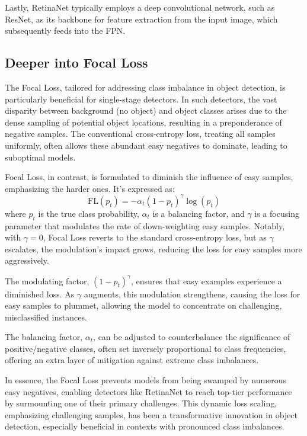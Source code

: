 \documentclass{article}
\begin{document}
Lastly, RetinaNet typically employs a deep convolutional network, such as ResNet, as its backbone for feature extraction from the input image, which subsequently feeds into the FPN.

\subsection{Deeper into Focal Loss}

The Focal Loss, tailored for addressing class imbalance in object detection, is particularly beneficial for single-stage detectors. In such detectors, the vast disparity between background (no object) and object classes arises due to the dense sampling of potential object locations, resulting in a preponderance of negative samples. The conventional cross-entropy loss, treating all samples uniformly, often allows these abundant easy negatives to dominate, leading to suboptimal models.

Focal Loss, in contrast, is formulated to diminish the influence of easy samples, emphasizing the harder ones. It's expressed as:
\[ \text{FL}(p_t) = -\alpha_t (1 - p_t)^\gamma \log(p_t) \]
where \( p_t \) is the true class probability, \( \alpha_t \) is a balancing factor, and \( \gamma \) is a focusing parameter that modulates the rate of down-weighting easy samples. Notably, with \( \gamma = 0 \), Focal Loss reverts to the standard cross-entropy loss, but as \( \gamma \) escalates, the modulation's impact grows, reducing the loss for easy samples more aggressively.

The modulating factor, \( (1 - p_t)^\gamma \), ensures that easy examples experience a diminished loss. As \( \gamma \) augments, this modulation strengthens, causing the loss for easy samples to plummet, allowing the model to concentrate on challenging, misclassified instances.

The balancing factor, \( \alpha_t \), can be adjusted to counterbalance the significance of positive/negative classes, often set inversely proportional to class frequencies, offering an extra layer of mitigation against extreme class imbalances.

In essence, the Focal Loss prevents models from being swamped by numerous easy negatives, enabling detectors like RetinaNet to reach top-tier performance by surmounting one of their primary challenges. This dynamic loss scaling, emphasizing challenging samples, has been a transformative innovation in object detection, especially beneficial in contexts with pronounced class imbalances.
\end{document}
